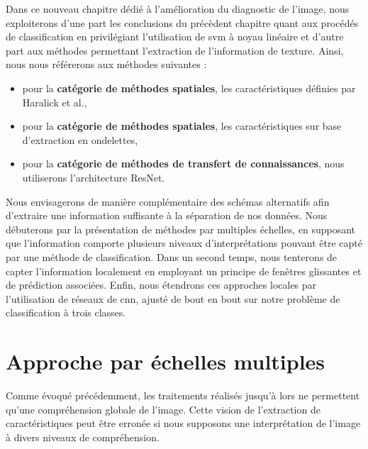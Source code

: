 Dans ce nouveau chapitre dédié à l'amélioration du diagnostic de l'image, nous exploiterons d'une part les conclusions du précèdent chapitre quant aux procédés de classification en privilégiant l'utilisation de \gls{svm} à noyau linéaire et d'autre part aux méthodes permettant l'extraction de l'information de texture. Ainsi, nous nous référerons aux méthodes suivantes :
\begin{itemize}
    \item pour la \textbf{catégorie de méthodes spatiales}, les caractéristiques définies par Haralick et al.,
    \item pour la \textbf{catégorie de méthodes spatiales}, les caractéristiques sur base d'extraction en ondelettes,
    \item pour la \textbf{catégorie de méthodes de transfert de connaissances}, nous utiliserons l'architecture ResNet.
\end{itemize}\par

Nous envisagerons de manière complémentaire des schémas alternatifs afin d'extraire une information suffisante à la séparation de nos données. Nous débuterons par la présentation de méthodes par multiples échelles, en supposant que l'information comporte plusieurs niveaux d'interprétations pouvant être capté par une méthode de classification. Dans un second temps, nous tenterons de capter l'information localement en employant un principe de fenêtres glissantes et de prédiction associées. Enfin, nous étendrons ces approches locales par l'utilisation de réseaux de \gls{cnn}, ajusté de bout en bout sur notre problème de classification à trois classes.\par
\clearpage

\section{Approche par échelles multiples}
Comme évoqué précédemment, les traitements réalisés jusqu'à lors ne permettent qu'une compréhension globale de l'image. Cette vision de l'extraction de caractéristiques peut être erronée si nous supposons une interprétation de l'image à divers niveaux de compréhension.\par

